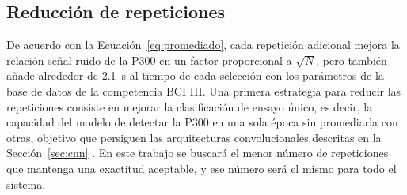 \subsection{Reducción de repeticiones}

De acuerdo con la Ecuación~\eqref{eq:promediado}, cada repetición adicional mejora la relación
señal-ruido de la P300 en un factor proporcional a $\sqrt{N}$, pero también añade alrededor de
2.1~s al tiempo de cada selección con los parámetros de la base de datos de la competencia BCI III. Una primera
estrategia para reducir las repeticiones consiste en mejorar la clasificación de ensayo único, es
decir, la capacidad del modelo de detectar la P300 en una sola época sin promediarla con otras,
objetivo que persiguen las arquitecturas convolucionales descritas en la Sección~\ref{sec:cnn}
\cite{cecotti2011,lawhern2018}. En este trabajo se buscará el menor número
de repeticiones que mantenga una exactitud aceptable, y ese número será el mismo para todo el
sistema.
